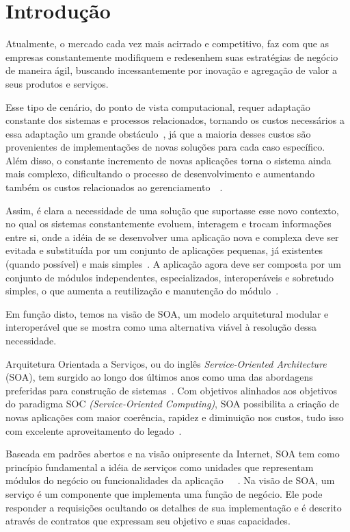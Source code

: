 \chapter{Introdução}

Atualmente, o mercado cada vez mais acirrado e competitivo, faz com que as empresas constantemente modifiquem e redesenhem suas estratégias de negócio de maneira ágil, buscando incessantemente por inovação e agregação de valor a seus produtos e serviços. 

Esse tipo de cenário, do ponto de vista computacional, requer adaptação constante dos sistemas e processos relacionados, tornando os custos necessários a essa adaptação um grande obstáculo~\cite{rabelo2006}, já que a maioria desses custos são provenientes de implementações de novas soluções para cada caso específico. Além disso, o constante incremento de novas aplicações torna o sistema ainda mais complexo, dificultando o processo de desenvolvimento e aumentando também os custos relacionados ao gerenciamento~\cite{rabelo2006}~\cite{ada2006}.

Assim, é clara a necessidade de uma solução que suportasse esse novo contexto, no qual os sistemas constantemente evoluem, interagem e trocam informações entre si, onde a idéia de se desenvolver uma aplicação nova e complexa deve ser evitada e substituída por um conjunto de aplicações pequenas, já existentes (quando possível) e mais simples~\cite{rabelo2006}. A aplicação agora deve ser composta por um conjunto de módulos independentes, especializados, interoperáveis e sobretudo simples, o que aumenta a reutilização e manutenção do módulo~\cite{oracle2005ws}.

Em função disto, temos na visão de SOA, um modelo arquitetural modular e interoperável que se mostra como uma alternativa viável à resolução dessa necessidade.

Arquitetura Orientada a Serviços, ou do inglês \textit{Service-Oriented Architecture} (SOA), tem surgido ao longo dos últimos anos como uma das abordagens preferidas para construção de sistemas~\cite{erl2008soa}. Com objetivos alinhados aos objetivos do paradigma SOC \textit{(Service-Oriented Computing)}, SOA possibilita a criação de novas aplicações com maior coerência, rapidez e diminuição nos custos, tudo isso com excelente aproveitamento do legado~\cite{erl2008soa}.

Baseada em padrões abertos e na visão onipresente da Internet, SOA tem como princípio fundamental a idéia de serviços como unidades que representam módulos do negócio ou funcionalidades da aplicação~\cite{erl2008soa}~\cite{imb2007soa}~\cite{cervantes2005technical}. Na visão de SOA, um serviço é um componente que implementa uma função de negócio. Ele pode responder a requisições ocultando os detalhes de sua implementação e é descrito através de contratos que expressam seu objetivo e suas capacidades. 

